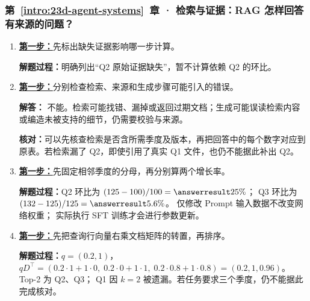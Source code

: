 \subsubsection*{第~\ref*{intro:23d-agent-systems}~章 · 检索与证据：RAG 怎样回答有来源的问题？}
\begin{enumerate}[label={},leftmargin=4.8em,itemsep=4pt]
\item[\textbf{C-097.}] \leavevmode{}\label{solution:C-097}\label{solution:missing-evidence-response}\hyperref[exercise:missing-evidence-response]{\textbf{第一步：}}先标出缺失证据影响哪一步计算。\par\nobreak\textbf{解题过程：}明确列出“Q2 原始证据缺失”，暂不计算依赖 Q2 的环比。
\item[\textbf{C-098.}] \leavevmode{}\label{solution:C-098}\label{solution:rag-failure-modes}\hyperref[exercise:rag-failure-modes]{\textbf{第一步：}}分别检查检索、来源和生成步骤可能引入的错误。\par\nobreak
\textbf{解答：} 不能。检索可能找错、漏掉或返回过期文档；生成可能误读检索内容或编造未被支持的细节，仍需要校验与来源。\par\textbf{核对：}可以先核查检索是否含所需季度及版本，再把回答中的每个数字对应到原表。若检索漏了 Q2，即使引用了真实 Q1 文件，也仍不能据此补出 Q2。
\item[\textbf{C-099.}] \leavevmode{}\label{solution:C-099}\label{solution:quarterly-evidence-update}\hyperref[exercise:quarterly-evidence-update]{\textbf{第一步：}}先固定相邻季度的分母，再分别算两个增长率。\par\nobreak
\textbf{解题过程：}Q2 环比为 $(125-100)/100=\answerresult{25\%}$；
Q3 环比为 $(132-125)/125=\answerresult{5.6\%}$。
仅修改 Prompt 输入数据不改变网络权重；
实际执行 SFT 训练才会进行参数更新。
\item[\textbf{C-100.}] \leavevmode{}\label{solution:C-100}\label{solution:rag-query-ranking}\hyperref[exercise:rag-query-ranking]{\textbf{第一步：}}先把查询行向量右乘文档矩阵的转置，再排序。\par\nobreak
\textbf{解题过程：}$q=(0.2,1)$，
$qD^\top=(0.2\cdot1+1\cdot0,\;0.2\cdot0+1\cdot1,\;
0.2\cdot0.8+1\cdot0.8)=(0.2,1,0.96)$。
Top-2 为 Q2、Q3；
Q1 因 $k=2$ 被遗漏。若任务要求三个季度，仍不能据此完成核对。
\end{enumerate}
